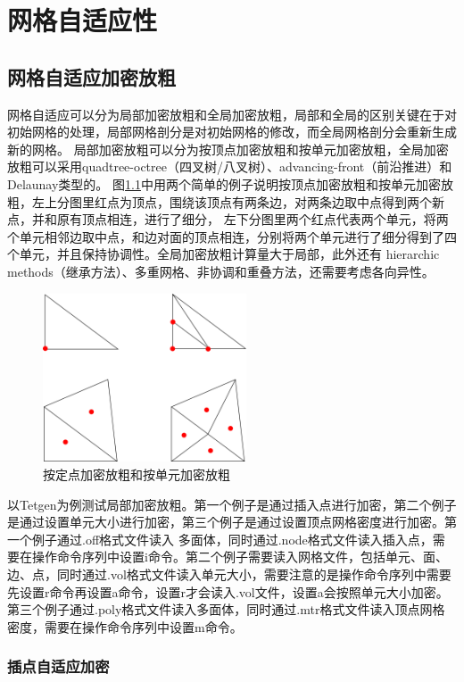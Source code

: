 \chapter{网格自适应性}

\section{网格自适应加密放粗}

网格自适应可以分为局部加密放粗和全局加密放粗，局部和全局的区别关键在于对初始网格的处理，局部网格剖分是对初始网格的修改，而全局网格剖分会重新生成新的网格。
局部加密放粗可以分为按顶点加密放粗和按单元加密放粗，全局加密放粗可以采用quadtree-octree（四叉树/八叉树）、advancing-front（前沿推进）和Delaunay类型的。
图\ref{fig:2-1}中用两个简单的例子说明按顶点加密放粗和按单元加密放粗，左上分图里红点为顶点，围绕该顶点有两条边，对两条边取中点得到两个新点，并和原有顶点相连，进行了细分，
左下分图里两个红点代表两个单元，将两个单元相邻边取中点，和边对面的顶点相连，分别将两个单元进行了细分得到了四个单元，并且保持协调性。全局加密放粗计算量大于局部，此外还有
hierarchic methods（继承方法）、多重网格、非协调和重叠方法，还需要考虑各向异性。

\begin{figure}[!htbp]
  \centering
  \includegraphics[height=5cm]{fig/2/1.png}
  \caption{按定点加密放粗和按单元加密放粗}
  \label{fig:2-1}
\end{figure}

以Tetgen为例测试局部加密放粗。第一个例子是通过插入点进行加密，第二个例子是通过设置单元大小进行加密，第三个例子是通过设置顶点网格密度进行加密。第一个例子通过.off格式文件读入
多面体，同时通过.node格式文件读入插入点，需要在操作命令序列中设置i命令。第二个例子需要读入网格文件，包括单元、面、边、点，同时通过.vol格式文件读入单元大小，需要注意的是操作命令序列中需要先设置r命令再设置a命令，设置r才会读入.vol文件，设置a会按照单元大小加密。第三个例子通过.poly格式文件读入多面体，同时通过.mtr格式文件读入顶点网格密度，需要在操作命令序列中设置m命令。

\subsection{插点自适应加密}

